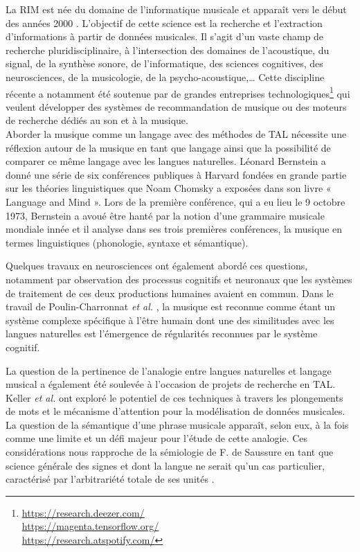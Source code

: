 La RIM est née du domaine de l’informatique musicale et apparaît vers le début
des années 2000 \cite{MIR_1}. L’objectif de cette science est la recherche et
l’extraction d’informations à partir de données musicales. Il s’agit d’un vaste
champ de recherche pluridisciplinaire, à l’intersection des domaines de
l’acoustique, du signal, de la synthèse sonore, de l’informatique, des sciences
cognitives, des neurosciences, de la musicologie, de la psycho-acoustique,…
Cette discipline récente a notamment été soutenue par
de grandes entreprises technologiques\footnote{\url{
https://research.deezer.com/}\\\url{https://magenta.tensorflow.org/}\\\url{
https://research.atspotify.com/}} qui veulent développer des systèmes de
recommandation de musique ou des moteurs de recherche dédiés au son et à la
musique.\\

Aborder la musique comme un langage avec des méthodes de TAL nécessite une
réflexion autour de la musique en tant que langage ainsi que la possibilité de
comparer ce même langage avec les langues naturelles. Léonard Bernstein
\cite{lbernstein} a donné une série de six conférences publiques à Harvard
fondées en grande partie sur les théories linguistiques que Noam Chomsky a
exposées dans son livre « Language and Mind ». Lors de la première conférence,
qui a eu lieu le 9 octobre 1973, Bernstein a avoué être hanté par la notion
d’une grammaire musicale mondiale innée et il analyse dans ses trois premières
conférences, la musique en termes linguistiques (phonologie, syntaxe et
sémantique).

Quelques travaux en neurosciences ont également abordé ces questions, notamment
par observation des processus cognitifs et neuronaux que les systèmes de
traitement de ces deux productions humaines avaient en commun. Dans le travail
de Poulin-Charronnat \textit{et al.} \cite{poulincharronnat}, la musique est
reconnue comme étant un système complexe spécifique à l’être humain dont une
des similitudes avec les langues naturelles est l’émergence de régularités
reconnues par le système cognitif.

La question de la pertinence de l’analogie entre langues naturelles et langage
musical a également été soulevée à l’occasion de projets de recherche en TAL.
Keller \textit{et al.} \cite{keller} ont exploré le potentiel de
ces techniques à travers les plongements de mots et le mécanisme d’attention
pour la modélisation de données musicales. La question de la sémantique d’une
phrase musicale apparaît, selon eux, à la fois comme une limite et un défi
majeur pour l’étude de cette analogie. Ces considérations nous rapproche de la
sémiologie de F. de Saussure en tant que science générale des signes et dont la
langue ne serait qu’un cas particulier, caractérisé par l’arbitrariété totale
de ses unités \cite{wunderli2017ferdinand}.


